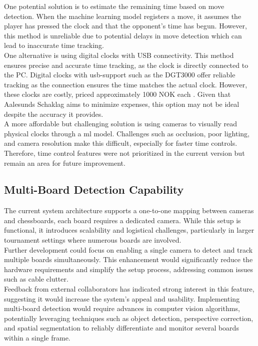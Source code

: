 One potential solution is to estimate the remaining time based on move detection. When the machine learning model registers a move, it assumes the player has pressed the clock and that the opponent’s time has begun. However, this method is unreliable due to potential delays in move detection which can lead to inaccurate time tracking. \\

One alternative is using digital clocks with USB connectivity. This method ensures precise and accurate time tracking, as the clock is directly connected to the PC. Digital clocks with \gls{usb}-support such as the DGT3000 offer reliable tracking as the connection ensures the time matches the actual clock. However, these clocks are costly, priced approximately 1000 NOK each \cite{sjakkbutikken:dgt-clock}. Given that Aalesunds Schaklag aims to minimize expenses, this option may not be ideal despite the accuracy it provides. \\

A more affordable but challenging solution is using cameras to visually read physical clocks through a \gls{ml} model. Challenges such as occlusion, poor lighting, and camera resolution make this difficult, especially for faster time controls. \\

Therefore, time control features were not prioritized in the current version but remain an area for future improvement.

\subsection{Multi-Board Detection Capability}
The current system architecture supports a one-to-one mapping between cameras and chessboards, each board requires a dedicated camera. While this setup is functional, it introduces scalability and logistical challenges, particularly in larger tournament settings where numerous boards are involved. \\

Further development could focus on enabling a single camera to detect and track multiple boards simultaneously. This enhancement would significantly reduce the hardware requirements and simplify the setup process, addressing common issues such as cable clutter. \\

Feedback from external collaborators has indicated strong interest in this feature, suggesting it would increase the system's appeal and usability. Implementing multi-board detection would require advances in computer vision algorithms, potentially leveraging techniques such as object detection, perspective correction, and spatial segmentation to reliably differentiate and monitor several boards within a single frame.

